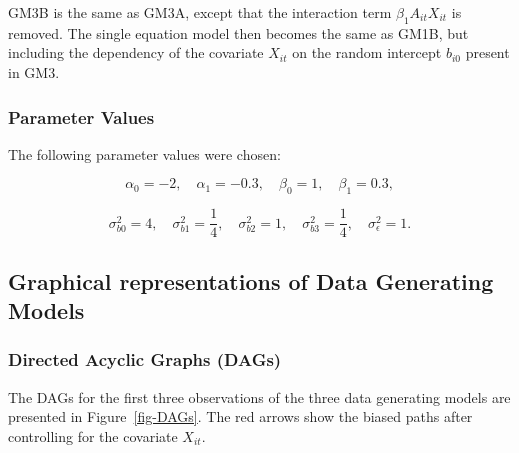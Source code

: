 \documentclass[
  12pt,
  a4paper,
]{article}
\begin{document}
GM3B is the same as GM3A, except that the interaction term
\(\beta_1 A_{it} X_{it}\) is removed. The single equation model then
becomes the same as GM1B, but including the dependency of the covariate
\(X_{it}\) on the random intercept \(b_{i0}\) present in GM3.

\subsubsection{Parameter Values}\label{parameter-values}

The following parameter values were chosen:

\[
\alpha_0 = -2, \quad \alpha_1 = -0.3, \quad \beta_0 = 1, \quad \beta_1 = 0.3,
\]

\[
\sigma_{b0}^2 = 4, \quad \sigma_{b1}^2 = \frac{1}{4}, \quad \sigma_{b2}^2 = 1, \quad \sigma_{b3}^2 = \frac{1}{4}, \quad \sigma_\epsilon^2 = 1.
\]

\subsection{Graphical representations of Data Generating
Models}\label{graphical-representations-of-data-generating-models}

\subsubsection{Directed Acyclic Graphs
(DAGs)}\label{directed-acyclic-graphs-dags}

The DAGs for the first three observations of the three data generating
models are presented in Figure~\ref{fig-DAGs}. The red arrows show the
biased paths after controlling for the covariate \(X_{it}\).
\end{document}

